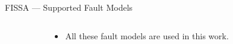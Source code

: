 \begin{frame}{FISSA — Supported Fault Models}
    
    \begin{columns}
        \begin{column}{.3\linewidth}
            \hfill
        \end{column}
        \begin{column}{.6\linewidth}
            \begin{itemize}
                [triangle]
                \justifying
            \item All these fault models are used in this work.
        \end{itemize}
        \end{column}
        \begin{column}{.1\linewidth}
            \hfill
        \end{column}
    \end{columns}
\end{frame}
